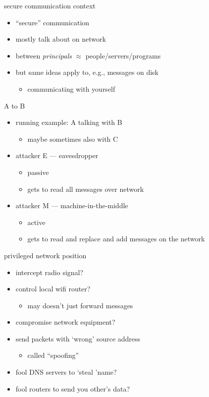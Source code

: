 \begin{frame}{secure communication context}
    \begin{itemize}
    \item ``secure'' communication
    \item mostly talk about on network
    \item between \textit{principals} $\approx$ people/servers/programs
    \vspace{.5cm}
    \item but same ideas apply to, e.g., messages on disk
        \begin{itemize}
        \item communicating with yourself
        \end{itemize}
    \end{itemize}
\end{frame}

\begin{frame}{A to B}
    \begin{itemize}
    \item running example: A talking with B
        \begin{itemize}
        \item maybe sometimes also with C
        \end{itemize}
    \item attacker E --- eavesdropper
        \begin{itemize}
        \item passive
        \item gets to read all messages over network
        \end{itemize}
    \item attacker M --- machine-in-the-middle
        \begin{itemize}
        \item active
        \item gets to read and replace and add messages on the network
        \end{itemize}
    \end{itemize}
\end{frame}

\begin{frame}{privileged network position}
    \begin{itemize}
    \item intercept radio signal?
    \item control local wifi router?
        \begin{itemize}
        \item may doesn't just forward messages
        \end{itemize}
    \item compromise network equipment?
    \item send packets with `wrong' source address
        \begin{itemize}
        \item called ``spoofing''
        \end{itemize}
    \item fool DNS servers to `steal 'name?
    \item fool routers to send you other's data?
    \end{itemize}
\end{frame}
